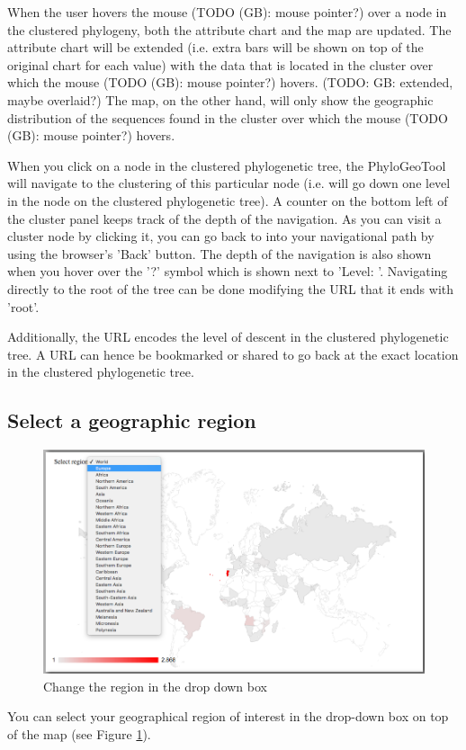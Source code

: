 \documentclass[a4paper, 11pt]{article} %
\begin{document}
When the user hovers the mouse (TODO (GB): mouse pointer?) over a node in the clustered phylogeny, both the attribute chart and the map are updated. 
The attribute chart will be extended (i.e. extra bars will be shown on top of the original chart for each value) with the data that is located in the cluster over which the mouse (TODO (GB): mouse pointer?) hovers. (TODO: GB: extended, maybe overlaid?)
The map, on the other hand, will only show the geographic distribution of the sequences found in the cluster over which the mouse (TODO (GB): mouse pointer?) hovers.

When you click on a node in the clustered phylogenetic tree, the PhyloGeoTool will navigate to the clustering of this particular node (i.e. will go down one level in the node on the clustered phylogenetic tree).
A counter on the bottom left of the cluster panel keeps track of the depth of the navigation. 
As you can visit a cluster node by clicking it, you can go back to into your navigational path by using the browser's 'Back' button.
The depth of the navigation is also shown when you hover over the '?' symbol which is shown next to 'Level: '. Navigating directly to the root of the tree can be done modifying the URL that it ends with 'root'. 

Additionally, the URL encodes the level of descent in the clustered phylogenetic tree. 
A URL can hence be bookmarked or shared to go back at the exact location in the clustered phylogenetic tree. 


\subsection{Select a geographic region}
\begin{figure}[H]
\centering
\includegraphics[scale=0.38]{images/change_country.PNG}
\vspace{-0.75cm}
\caption{Change the region in the drop down box}
\label{fig:change_region}
\end{figure}
You can select your geographical region of interest in the drop-down box on top of the map (see Figure \ref{fig:change_region}). 
\end{document}
